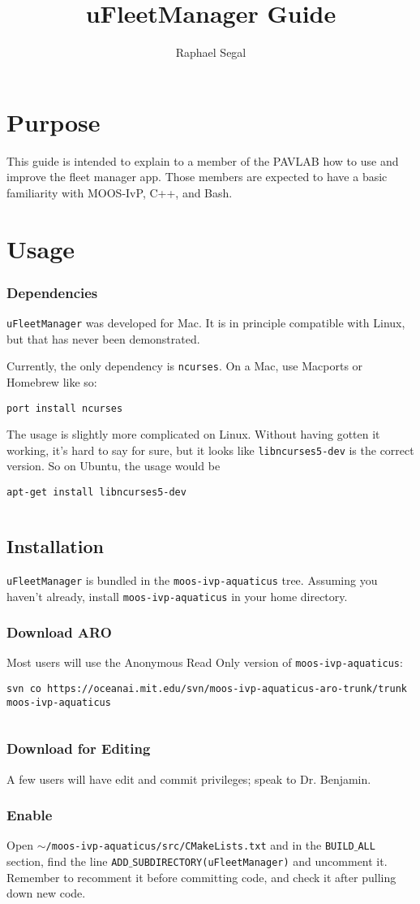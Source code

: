 \documentclass[11pt]{article}
\author{Raphael Segal}
\title{uFleetManager Guide}
\newcommand{\cmdline}[1]{\vspace{.5em} $\:$\\ \begin{minipage}{\dimexpr\textwidth-2cm}
\texttt{#1}
\end{minipage} $\:$\\ \vspace{-.5em} }
\begin{document}
\maketitle
\section{Purpose}
This guide is intended to explain to a member of the PAVLAB how to use and improve the fleet manager app. Those members are expected to have a basic familiarity with MOOS-IvP, C++, and Bash.
\section{Usage}
\subsubsection{Dependencies}
\texttt{uFleetManager} was developed for Mac. It is in principle compatible with Linux, but that has never been demonstrated.

Currently, the only dependency is \texttt{ncurses}. On a Mac, use Macports or Homebrew like so:
\cmdline{port install ncurses}
The usage is slightly more complicated on Linux. Without having gotten it working, it's hard to say for sure, but it looks like \texttt{libncurses5-dev} is the correct version. So on Ubuntu, the usage would be
\cmdline{apt-get install libncurses5-dev}
\subsection{Installation}
\texttt{uFleetManager} is bundled in the \texttt{moos-ivp-aquaticus} tree. Assuming you haven't already, install \texttt{moos-ivp-aquaticus} in your home directory.
\subsubsection{Download ARO}
Most users will use the Anonymous Read Only version of \texttt{moos-ivp-aquaticus}: 
\cmdline{svn co https://oceanai.mit.edu/svn/moos-ivp-aquaticus-aro-trunk/trunk moos-ivp-aquaticus}
\subsubsection{Download for Editing}
A few users will have edit and commit privileges; speak to Dr. Benjamin.
\subsubsection{Enable}
Open \texttt{$\sim$/moos-ivp-aquaticus/src/CMakeLists.txt} and in the \texttt{BUILD$\_$ALL} section, find the line \texttt{ADD$\_$SUBDIRECTORY(uFleetManager)} and uncomment it. Remember to recomment it before committing code, and check it after pulling down new code.
\end{document}
